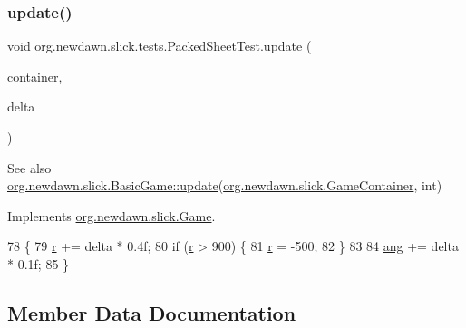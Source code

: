 \subsubsection{\texorpdfstring{update()}{update()}}
{\footnotesize\ttfamily void org.\+newdawn.\+slick.\+tests.\+Packed\+Sheet\+Test.\+update (\begin{DoxyParamCaption}\item[{\mbox{\hyperlink{classorg_1_1newdawn_1_1slick_1_1_game_container}{Game\+Container}}}]{container,  }\item[{int}]{delta }\end{DoxyParamCaption})\hspace{0.3cm}{\ttfamily [inline]}}

\begin{DoxySeeAlso}{See also}
\mbox{\hyperlink{classorg_1_1newdawn_1_1slick_1_1_basic_game_acfe6fa05aef83bff1631af91a3e4bd20}{org.\+newdawn.\+slick.\+Basic\+Game\+::update}}(\mbox{\hyperlink{classorg_1_1newdawn_1_1slick_1_1_game_container}{org.\+newdawn.\+slick.\+Game\+Container}}, int) 
\end{DoxySeeAlso}


Implements \mbox{\hyperlink{interfaceorg_1_1newdawn_1_1slick_1_1_game_ab07b2e9463ee4631620dde0de25bdee8}{org.\+newdawn.\+slick.\+Game}}.


\begin{DoxyCode}
78                                                            \{
79         \mbox{\hyperlink{classorg_1_1newdawn_1_1slick_1_1tests_1_1_packed_sheet_test_a05f9b0080fb3be5b16ca385be62b313e}{r}} += delta * 0.4f;
80         \textcolor{keywordflow}{if} (\mbox{\hyperlink{classorg_1_1newdawn_1_1slick_1_1tests_1_1_packed_sheet_test_a05f9b0080fb3be5b16ca385be62b313e}{r}} > 900) \{
81             \mbox{\hyperlink{classorg_1_1newdawn_1_1slick_1_1tests_1_1_packed_sheet_test_a05f9b0080fb3be5b16ca385be62b313e}{r}} = -500;
82         \}
83         
84         \mbox{\hyperlink{classorg_1_1newdawn_1_1slick_1_1tests_1_1_packed_sheet_test_a0be222259a5aa1c22ffe9fa2f06d207d}{ang}} += delta * 0.1f;
85     \}
\end{DoxyCode}


\subsection{Member Data Documentation}
\mbox{\label{classorg_1_1newdawn_1_1slick_1_1tests_1_1_packed_sheet_test_a0be222259a5aa1c22ffe9fa2f06d207d}} 
